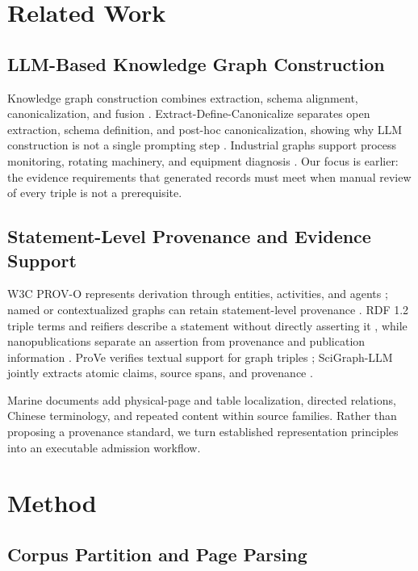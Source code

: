 \documentclass[conference,a4paper]{IEEEtran}
\begin{document}
\section{Related Work}

\subsection{LLM-Based Knowledge Graph Construction}

Knowledge graph construction combines extraction, schema alignment, canonicalization, and fusion \cite{Hogan2021,Ji2022}. Extract-Define-Canonicalize separates open extraction, schema definition, and post-hoc canonicalization, showing why LLM construction is not a single prompting step \cite{Zhang2024EDC}. Industrial graphs support process monitoring, rotating machinery, and equipment diagnosis \cite{Han2022,Cai2024,Wu2024}. Our focus is earlier: the evidence requirements that generated records must meet when manual review of every triple is not a prerequisite.

\subsection{Statement-Level Provenance and Evidence Support}

W3C PROV-O represents derivation through entities, activities, and agents \cite{W3CPROVO}; named or contextualized graphs can retain statement-level provenance \cite{Sikos2020}. RDF 1.2 triple terms and reifiers describe a statement without directly asserting it \cite{W3CRDF12}, while nanopublications separate an assertion from provenance and publication information \cite{Groth2010}. ProVe verifies textual support for graph triples \cite{Amaral2024ProVe}; SciGraph-LLM jointly extracts atomic claims, source spans, and provenance \cite{Malashin2026}.

Marine documents add physical-page and table localization, directed relations, Chinese terminology, and repeated content within source families. Rather than proposing a provenance standard, we turn established representation principles into an executable admission workflow.

\section{Method}

\subsection{Corpus Partition and Page Parsing}
\end{document}
